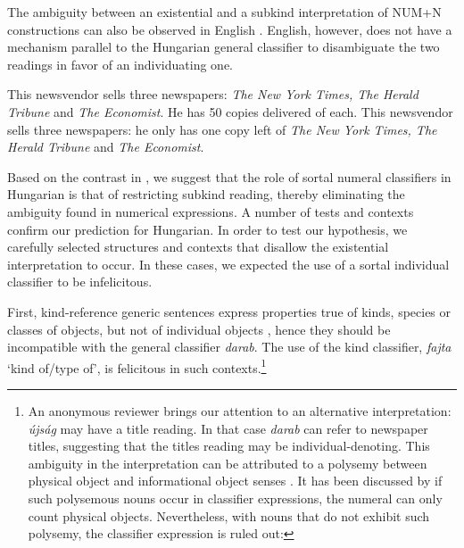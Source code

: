 \documentclass[output=paper]{langscibook}
\begin{document}
\noindent The ambiguity between an existential and a subkind interpretation of NUM+N constructions can also be observed in English . English, however, does not have a mechanism parallel to the Hungarian general classifier to disambiguate the two readings in favor of an individuating one. 

\ea \label{schv-nem:ex:9}
\ea \label{schv-nem:ex:9a}
This newsvendor sells three newspapers: \textit{The New York Times, The Herald Tribune} and \textit{The Economist}. He has 50 copies delivered of each.
\ex \label{schv-nem:ex:9b}
This newsvendor sells three newspapers: he only has one copy left of \textit{The New York Times, The Herald Tribune} and \textit{The Economist}.
\z
\z

\noindent Based on the contrast in , we suggest that the role of sortal numeral classifiers in Hungarian is that of restricting subkind reading, thereby eliminating the ambiguity found in numerical expressions. A number of tests and contexts confirm our prediction for Hungarian. In order to test our hypothesis, we carefully selected structures and contexts that disallow the existential interpretation to occur. In these cases, we expected the use of a sortal individual classifier to be infelicitous.

First, kind-reference generic sentences express properties true of kinds, species or classes of objects, but not of individual objects \citep{krifka-etal-95}, hence they should be incompatible with the general classifier \textit{darab}. The use of the kind classifier, \textit{fajta} `kind of/type of', is felicitous in such contexts.\footnote{An anonymous reviewer brings our attention to an alternative interpretation: \textit{újság} may have a title reading. In that case \textit{darab} can refer to newspaper titles, suggesting that the titles reading may be individual-denoting. This ambiguity in the interpretation can be attributed to a polysemy between physical object and informational object senses \citep{puste95, asher-11}. It has been discussed by \citet{schvarcz-wohlmuth-20} if such polysemous  nouns occur in classifier expressions, the numeral can only count physical objects. Nevertheless, with nouns that do not exhibit such polysemy, the classifier expression is ruled out: 

\z} 
\end{document}
